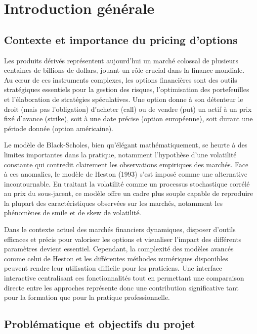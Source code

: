 \chapter*{Introduction générale}
\label{sec:Introduction}

\section*{Contexte et importance du pricing d'options}

Les produits dérivés représentent aujourd'hui un marché colossal de plusieurs centaines de billions de dollars, jouant un rôle crucial dans la finance mondiale. Au cœur de ces instruments complexes, les options financières sont des outils stratégiques essentiels pour la gestion des risques, l'optimisation des portefeuilles et l'élaboration de stratégies spéculatives. Une option donne à son détenteur le droit (mais pas l'obligation) d'acheter (call) ou de vendre (put) un actif à un prix fixé d'avance (strike), soit à une date précise (option européenne), soit durant une période donnée (option américaine).

Le modèle de Black-Scholes, bien qu'élégant mathématiquement, se heurte à des limites importantes dans la pratique, notamment l'hypothèse d'une volatilité constante qui contredit clairement les observations empiriques des marchés. Face à ces anomalies, le modèle de Heston (1993) s'est imposé comme une alternative incontournable. En traitant la volatilité comme un processus stochastique corrélé au prix du sous-jacent, ce modèle offre un cadre plus souple capable de reproduire la plupart des caractéristiques observées sur les marchés, notamment les phénomènes de smile et de skew de volatilité.

Dans le contexte actuel des marchés financiers dynamiques, disposer d'outils efficaces et précis pour valoriser les options et visualiser l'impact des différents paramètres devient essentiel. Cependant, la complexité des modèles avancés comme celui de Heston et les différentes méthodes numériques disponibles peuvent rendre leur utilisation difficile pour les praticiens. Une interface interactive centralisant ces fonctionnalités tout en permettant une comparaison directe entre les approches représente donc une contribution significative tant pour la formation que pour la pratique professionnelle.

\section*{Problématique et objectifs du projet}

